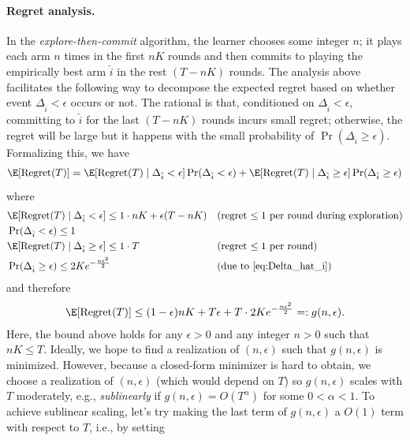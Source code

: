 \paragraph{Regret analysis.}
In the {\em explore-then-commit} algorithm, the learner chooses some integer $n$; it plays each arm $n$ times in the first $nK$ rounds and then commits to playing the empirically best arm $\hat{i}$ in the rest $(T-nK)$ rounds.
The analysis above facilitates the following way to decompose the expected regret based on whether event $\Delta_{\hat{i}}<\epsilon$ occurs or not.
The rational is that, conditioned on $\Delta_{\hat{i}}<\epsilon$, committing to $\hat{i}$ for the last $(T-nK)$ rounds incurs small regret; otherwise, the regret will be large but it happens with the small probability of $\Pr(\Delta_{\hat{i}}\geq \epsilon)$.
Formalizing this, we have
\begin{align}
\label{eq:explore_then_commit-regret_decomposition}
\E[\Regret(T)]=\E[\Regret(T)\mid\Delta_{\hat{i}}<\epsilon] \Pr(\Delta_{\hat{i}}<\epsilon)+\E[\Regret(T)\mid\Delta_{\hat{i}}\geq\epsilon] \Pr(\Delta_{\hat{i}}\geq\epsilon)
\end{align}
where 
\begin{align*}
    &\E[\Regret(T)\mid\Delta_{\hat{i}}<\epsilon] \leq 1 \cdot nK+\epsilon(T-nK) &&\text{(regret $\leq1$ per round during exploration)}\\
    &\Pr(\Delta_{\hat{i}}<\epsilon) \leq 1\\
    &\E[\Regret(T)\mid\Delta_{\hat{i}}\geq\epsilon]  \leq 1\cdot T &&\text{(regret $\leq1$ per round)}\\
    &\Pr(\Delta_{\hat{i}}\geq\epsilon)\leq 2K e^{-\frac{n \epsilon^2}{2}} &&\text{(due to \eqref{eq:Delta_hat_i})}
\end{align*}
and therefore 
\begin{align*}
    \E[\Regret(T)]\leq (1-\epsilon)nK + T\epsilon + T\cdot2K e^{-\frac{n \epsilon^2}{2}}=:g(n,\epsilon)
    .
\end{align*}
Here, the bound above holds for any $\epsilon>0$ and any integer $n>0$ such that $nK\leq T$.
Ideally, we hope to find a realization of $(n,\epsilon)$ such that $g(n,\epsilon)$ is minimized.
However, because a closed-form minimizer is hard to obtain, we choose a realization of $(n,\epsilon)$ (which would depend on $T$) so $g(n,\epsilon)$ scales with $T$ moderately, e.g., {\em sublinearly} if $g(n,\epsilon) = O(T^\alpha)$ for some $0<\alpha<1$.
To achieve sublinear scaling, let's try making the last term of $g(n,\epsilon)$ a $O(1)$ term with respect to $T$, i.e., by setting
